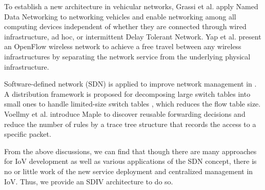 \documentclass[journal]{IEEEtran}
\begin{document}
To establish a new architecture in vehicular networks, Grassi et al. \cite{grassi2014vanet} apply Named Data Networking to networking vehicles and enable networking among all computing devices independent of whether they are connected through wired infrastructure, ad hoc, or intermittent Delay Tolerant Network. Yap et al. \cite{yap2010blueprint} present an OpenFlow \cite{mckeown2008openflow} wireless network to achieve a free travel between any wireless infrastructures by separating the network service from the underlying physical infrastructure.

Software-defined network (SDN) is applied to improve network management in \cite{kim2013improving}. A distribution framework is proposed for decomposing large switch tables into small ones to handle limited-size switch tables \cite{kanizo2013palette}, which reduces the flow table size. Voellmy et al. \cite{voellmy2013maple} introduce Maple to discover reusable forwarding decisions and reduce the number of rules by a trace tree structure that records the access to a specific packet.

From the above discussions, we can find that though there are many approaches for IoV development as well as various applications of the SDN concept, there is no or little work of the new service deployment and centralized management in IoV. Thus, we provide an SDIV architecture to do so.







\end{document}
